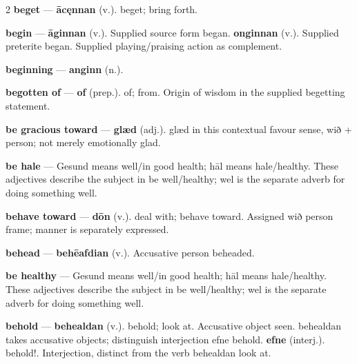 \begin{multicols}{2}
\textbf{beget} — \textbf{ācęnnan} (v.). beget; bring forth.\par
\textbf{begin} — \textbf{āginnan} (v.). Supplied source form began. \textbf{onginnan} (v.). Supplied preterite began. Supplied playing/praising action as complement.\par
\textbf{beginning} — \textbf{anginn} (n.).\par
\textbf{begotten of} — \textbf{of} (prep.). of; from. Origin of wisdom in the supplied begetting statement.\par
\textbf{be gracious toward} — \textbf{glæd} (adj.). glæd in this contextual favour sense, wið + person; not merely emotionally glad.\par
\textbf{be hale} — Gesund means well/in good health; hāl means hale/healthy. These adjectives describe the subject in be well/healthy; wel is the separate adverb for doing something well.\par
\textbf{behave toward} — \textbf{dōn} (v.). deal with; behave toward. Assigned wið person frame; manner is separately expressed.\par
\textbf{behead} — \textbf{behēafdian} (v.). Accusative person beheaded.\par
\textbf{be healthy} — Gesund means well/in good health; hāl means hale/healthy. These adjectives describe the subject in be well/healthy; wel is the separate adverb for doing something well.\par
\textbf{behold} — \textbf{behealdan} (v.). behold; look at. Accusative object seen. behealdan takes accusative objects; distinguish interjection efne behold. \textbf{efne} (interj.). behold!. Interjection, distinct from the verb behealdan look at.\par

\end{multicols}
